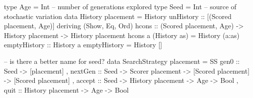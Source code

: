 type Age  = Int -- number of generations explored
type Seed = Int -- source of stochastic variation
data History placement = History { unHistory :: [(Scored placement, Age)] }
  deriving (Show, Eq, Ord)
hcons :: (Scored placement, Age) -> History placement -> History placement
hcons a (History as) = History (a:as)
emptyHistory :: History a
emptyHistory = History []

-- is there a better name for seed?
data SearchStrategy placement = 
 SS { gen0    :: Seed -> [placement]
    , nextGen :: Seed -> Scorer placement
              -> [Scored placement] -> [Scored placement]
    , accept  :: Seed -> History placement -> Age -> Bool
    , quit    ::         History placement -> Age -> Bool
    }
